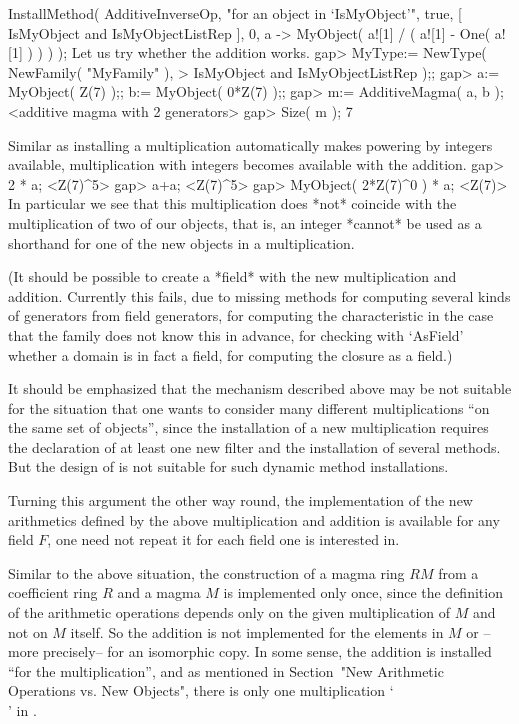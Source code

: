 InstallMethod( AdditiveInverseOp,
    "for an object in `IsMyObject'",
    true,
    [ IsMyObject and IsMyObjectListRep ], 0,
    a -> MyObject( a![1] / ( a![1] - One( a![1] ) ) ) );
\endtt
Let us try whether the addition works.
\begintt
gap> MyType:= NewType( NewFamily( "MyFamily" ),
>                   IsMyObject and IsMyObjectListRep );;
gap> a:= MyObject( Z(7) );;  b:= MyObject( 0*Z(7) );;
gap> m:= AdditiveMagma( a, b );
<additive magma with 2 generators>
gap> Size( m );
7
\endtt

Similar as installing a multiplication automatically makes
powering by integers available,
multiplication with integers becomes available with the addition.
\begintt
gap> 2 * a;
<Z(7)^5>
gap> a+a;
<Z(7)^5>
gap> MyObject( 2*Z(7)^0 ) * a;
<Z(7)>
\endtt
In particular we see that this multiplication does *not* coincide
with the multiplication of two of our objects,
that is, an integer *cannot* be used as a shorthand for one of the
new objects in a multiplication.

(It should be possible to create a *field* with the new multiplication
and addition.
Currently this fails, due to missing methods for computing
several kinds of generators from field generators,
for computing the characteristic in the case that the family does not
know this in advance,
for checking with `AsField' whether a domain is in fact a field,
for computing the closure as a field.)

It should be emphasized that the mechanism described above may be not
suitable for the situation that one wants to consider many different
multiplications ``on the same set of objects'',
since the installation of a new multiplication requires the declaration
of at least one new filter and the installation of several methods.
But the design of {\GAP} is not suitable for such dynamic method
installations.

Turning this argument the other way round,
the implementation of the new arithmetics defined by the above
multiplication and addition is available for any field $F$,
one need not repeat it for each field one is interested in.

Similar to the above situation,
the construction of a magma ring $RM$ from a coefficient ring $R$
and a magma $M$ is implemented only once,
since the definition of the arithmetic operations depends only on the
given multiplication of $M$ and not on $M$ itself.
So the addition is not implemented for the elements in $M$ or
--more precisely-- for an isomorphic copy.
In some sense, the addition is installed ``for the multiplication'',
and as mentioned in Section~"New Arithmetic Operations vs. New Objects",
there is only one multiplication `\\\*' in {\GAP}.



